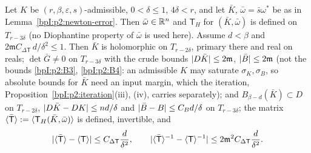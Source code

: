 \begin{lemma}\label{bpI:p2:torsion}
Let $K$ be $(r,\beta,\varepsilon,s)$-admissible, $0<\delta\le1$, $4\delta<r$, and let $\bar K$, $\bar\omega=\bar s\omega^*$ be as in Lemma~\ref{bpI:p2:newton-error}. Then $\bar\omega\in\mathbb{R}^n$ and $\mathsf T_H$ for $(\bar K,\bar\omega)$ is defined on $T_{r-3\delta}$ (no Diophantine property of $\bar\omega$ is used here). Assume $d<\beta$ and $2\mathfrak mC_{\Delta\mathsf T}\,d/\delta^2\le1$. Then $\bar K$ is holomorphic on $T_{r-2\delta}$, primary there and real on reals; $\det\bar G\ne0$ on $T_{r-3\delta}$ with the crude bounds $\lvert D\bar K\rvert\le2\mathfrak m$, $\lvert \bar B\rvert\le2\mathfrak m$ (not the bounds \ref{bpI:p2:B3}, \ref{bpI:p2:B4}: an admissible $K$ may saturate $\sigma_K,\sigma_B$, so absolute bounds for $\bar K$ need an input margin, which the iteration, Proposition~\ref{bpI:p2:iteration}(iii), (iv), carries separately); and
$B_{\beta-d}(\bar K)\subset D$ on $T_{r-2\delta}$, $\lvert D\bar K-DK\rvert\le nd/\delta$ and $\lvert \bar B-B\rvert\le C_Bd/\delta$ on $T_{r-3\delta}$; the matrix
$\langle \bar{\mathsf T}\rangle:=\langle \mathsf T_H(\bar K,\bar\omega)\rangle$ is defined, invertible, and
\[
\lvert \langle \bar{\mathsf T}\rangle-\langle \mathsf T\rangle\rvert\le C_{\Delta\mathsf T}\frac d{\delta^2},\qquad\lvert \langle \bar{\mathsf T}\rangle^{-1}-\langle \mathsf T\rangle^{-1}\rvert\le2\mathfrak m^2C_{\Delta\mathsf T}\frac d{\delta^2}.
\]
\end{lemma}
